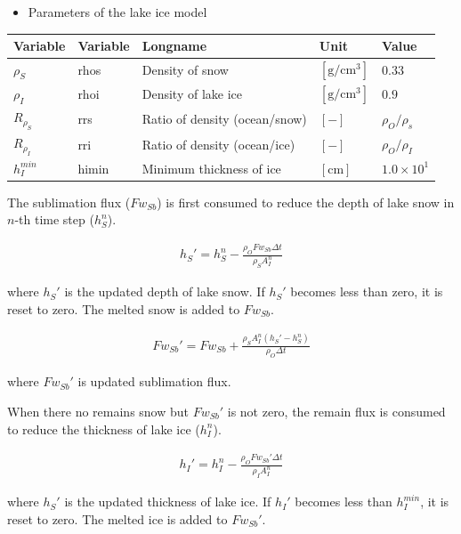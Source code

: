\begin{itemize}
\tightlist
\item
  Parameters of the lake ice model
\end{itemize}

\begin{longtable}[]{@{}lllll@{}}
\toprule\noalign{}
Variable & Variable & Longname & Unit & Value \\
\midrule\noalign{}
\endhead
\bottomrule\noalign{}
\endlastfoot
\(\rho_S\) & rhos & Density of snow & \(\mathrm{[g/cm^3]}\) & \(0.33\) \\
\(\rho_I\) & rhoi & Density of lake ice & \(\mathrm{[g/cm^3]}\) & \(0.9\) \\
\(R_{\rho_S}\) & rrs & Ratio of density (ocean/snow) & \(\mathrm{[-]}\) & \(\rho_O/\rho_s\) \\
\(R_{\rho_I}\) & rri & Ratio of density (ocean/ice) & \(\mathrm{[-]}\) & \(\rho_O/\rho_I\) \\
\(h_I^{min}\) & himin & Minimum thickness of ice & \(\mathrm{[cm]}\) & \(1.0\times 10^1\) \\
\end{longtable}

The sublimation flux (\(Fw_{Sb}\)) is first consumed to reduce the depth of lake snow in \(n\)-th time step (\(h_S^n\)).

\begin{eqnarray}
    h_S' = h_S^n -  \frac{\rho_O  Fw_{Sb}\Delta t}{\rho_S A_I^n}
\end{eqnarray}

where \(h_S'\) is the updated depth of lake snow. If \(h_S'\) becomes less than zero, it is reset to zero. The melted snow is added to \(Fw_{Sb}\).

\begin{eqnarray}
    Fw_{Sb}' = Fw_{Sb} + \frac{\rho_S A_I^n (h_S' - h_S^n)}{\rho_O\Delta t}
\end{eqnarray}

where \(Fw_{Sb}'\) is updated sublimation flux.

When there no remains snow but \(Fw_{Sb}'\) is not zero, the remain flux is consumed to reduce the thickness of lake ice (\(h_I^n\)).

\begin{eqnarray}
    h_I' = h_I^n - \frac{\rho_O Fw_{Sb}' \Delta t }{\rho_I A_I^n}
\end{eqnarray}

where \(h_S'\) is the updated thickness of lake ice. If \(h_I'\) becomes less than \(h_I^{min}\), it is reset to zero. The melted ice is added to \(Fw_{Sb}'\).

